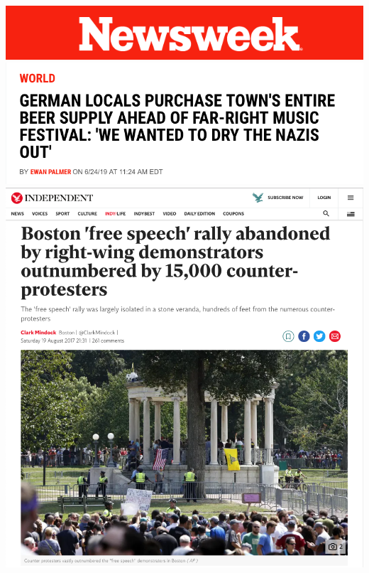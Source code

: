\documentclass[nobackground,dvipsnames,table]{beamer}
\begin{document}
\begin{frame}{}
    \begin{columns}
            \centering
            \includegraphics[width=\textwidth]{newsweek}
            \includegraphics[width=\textwidth]{newsweek-article}
            \includegraphics[width=\textwidth]{rally-abandoned-counterprotests}
    \end{columns}
\end{frame}
\end{document}
